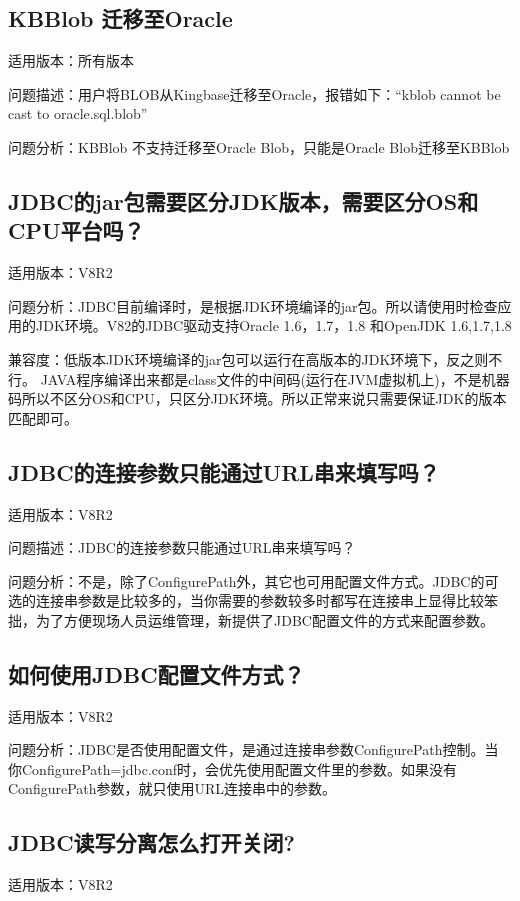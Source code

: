 \documentclass[a4,10pt,oneside,english]{sphinxmanual}
\begin{document}
\subsection{KBBlob 迁移至Oracle}
\label{\detokenize{interface/jdbc:kbblob-oracle}}
适用版本：所有版本

问题描述：用户将BLOB从Kingbase迁移至Oracle，报错如下：“kblob cannot be cast to oracle.sql.blob”

问题分析：KBBlob 不支持迁移至Oracle Blob，只能是Oracle Blob迁移至KBBlob


\subsection{JDBC的jar包需要区分JDK版本，需要区分OS和CPU平台吗？}
\label{\detokenize{interface/jdbc:jdbcjarjdk-oscpu}}
适用版本：V8R2

问题分析：JDBC目前编译时，是根据JDK环境编译的jar包。所以请使用时检查应用的JDK环境。V82的JDBC驱动支持Oracle 1.6，1.7，1.8 和OpenJDK 1.6,1.7,1.8

兼容度：低版本JDK环境编译的jar包可以运行在高版本的JDK环境下，反之则不行。
JAVA程序编译出来都是class文件的中间码(运行在JVM虚拟机上)，不是机器码所以不区分OS和CPU，只区分JDK环境。所以正常来说只需要保证JDK的版本匹配即可。


\subsection{JDBC的连接参数只能通过URL串来填写吗？}
\label{\detokenize{interface/jdbc:jdbcurl}}
适用版本：V8R2

问题描述：JDBC的连接参数只能通过URL串来填写吗？

问题分析：不是，除了ConfigurePath外，其它也可用配置文件方式。JDBC的可选的连接串参数是比较多的，当你需要的参数较多时都写在连接串上显得比较笨拙，为了方便现场人员运维管理，新提供了JDBC配置文件的方式来配置参数。


\subsection{如何使用JDBC配置文件方式？}
\label{\detokenize{interface/jdbc:id2}}
适用版本：V8R2

问题分析：JDBC是否使用配置文件，是通过连接串参数ConfigurePath控制。当你ConfigurePath=jdbc.conf时，会优先使用配置文件里的参数。如果没有ConfigurePath参数，就只使用URL连接串中的参数。


\subsection{JDBC读写分离怎么打开关闭?}
\label{\detokenize{interface/jdbc:id3}}
适用版本：V8R2
\end{document}
